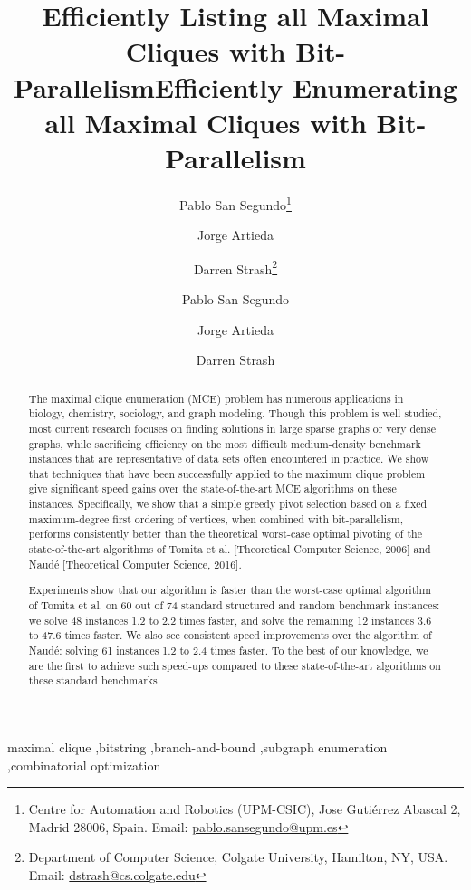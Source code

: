 \documentclass[final,1p]{elsarticle-modified}
\title{Efficiently Listing all Maximal Cliques with Bit-Parallelism}
\author{
  Pablo San Segundo\thanks{Centre for Automation and Robotics (UPM-CSIC),
  Jose Guti\'errez Abascal 2, Madrid 28006, Spain.
  Email: \href{mailto:pablo.sansegundo@upm.es}{pablo.sansegundo@upm.es}
  }
  \and
  Jorge Artieda\footnotemark[1]
  \and
  Darren Strash\thanks{Department of Computer Science, Colgate University, Hamilton, NY, USA.
    Email: \href{mailto:dstrash@cs.colgate.edu}{dstrash@cs.colgate.edu}
  }
}
\begin{document}
\ifElsevier
\begin{frontmatter}
\title{Efficiently Enumerating all Maximal Cliques with Bit-Parallelism}

\author[upm]{Pablo San Segundo}
\author[upm]{Jorge Artieda}
\author[colgate]{Darren Strash}

\address[upm]{Centre for Automation and Robotics (UPM-CSIC),
  Jose Guti\'errez Abascal 2, Madrid 28006, Spain.}
\address[colgate]{Department of Computer Science, Colgate University, Hamilton, NY, USA.}

\begin{abstract}
The maximal clique enumeration (MCE) problem has numerous applications in biology, chemistry, sociology, and graph modeling. Though this problem is well studied, most current research focuses on finding solutions in large sparse graphs or very dense graphs, while sacrificing efficiency on the most difficult medium-density benchmark instances that are representative of data sets often encountered in practice. We show that techniques that have been successfully applied to the maximum clique problem give significant speed gains over the state-of-the-art MCE algorithms on these instances. Specifically, we show that a simple greedy pivot selection based on a fixed maximum-degree first ordering of vertices, when combined with bit-parallelism, performs consistently better than the theoretical worst-case optimal pivoting of the state-of-the-art algorithms of Tomita et al. [Theoretical Computer Science, 2006] and Naud\'e [Theoretical Computer Science, 2016].

Experiments show that our algorithm is faster than the worst-case optimal algorithm of Tomita et al. on 60 out of 74 standard structured and random benchmark instances: we solve 48 instances 1.2 to 2.2 times faster, and solve the remaining 12 instances 3.6 to 47.6 times faster. We also see consistent speed improvements over the algorithm of Naud\'e: solving 61 instances 1.2 to 2.4 times faster. To the best of our knowledge, we are the first to achieve such speed-ups compared to these state-of-the-art algorithms on these standard benchmarks.
\end{abstract}


\begin{keyword}
maximal clique \sep bitstring \sep branch-and-bound \sep subgraph enumeration \sep combinatorial optimization
\end{keyword}
\end{frontmatter}
\end{document}

